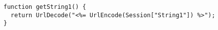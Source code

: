 {\ssp
\begin{lstlisting}[language={[Sharp]C}, caption={ASP.NET WebForm that generates the JavaScript function used in Listing~\ref{code:simple-compiled-rewritten-string}.}, label=code:get-string-one, float]
function getString1() {
  return UrlDecode("<%= UrlEncode(Session["String1"]) %>");
}
\end{lstlisting}
}
